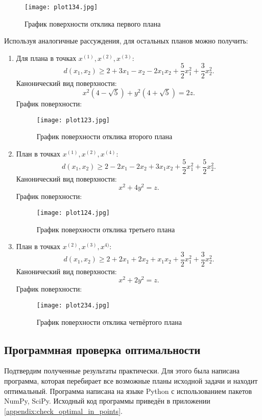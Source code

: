 \begin{figure}[h]
	\centering
	\texttt{[image: plot134.jpg]}
	\caption{График поверхности отклика первого плана}
\end{figure}

Используя аналогичные рассуждения, для остальных планов можно получить:
\begin{enumerate}
	\item Для плана в точках $x^{(1)}, x^{(2)}, x^{(3)}$:
	$$d(x_1, x_2) \ge 2 + 3x_1 - x_2 -2x_1x_2 +\frac{5}{2}x_1^2 + \frac 3 2 x_2^2.$$
	Канонический вид поверхности:
	$$x^2 (4 - \sqrt{5}) + y^2 (4 + \sqrt 5) = 2z.$$
	График поверхности:
	
	\begin{figure}[h]
		\centering
		\texttt{[image: plot123.jpg]}
		\caption{График поверхности отклика второго плана}
	\end{figure}
	
	\item План в точках $x^{(1)}, x^{(2)}, x^{(4)}$:
	$$d(x_1, x_2) \ge 2 - 2x_1 - 2x_2 +3x_1x_2 +\frac{5}{2}x_1^2 + \frac 5 2 x_2^2.$$
	Канонический вид поверхности:
	$$x^2 + 4y^2 = z.$$
	График поверхности:
	\begin{figure}[h]
		\centering
		\texttt{[image: plot124.jpg]}
		\caption{График поверхности отклика третьего плана}
	\end{figure}

	\item План в точках $x^{(2)}, x^{(3)}, x^{4)}$:
	$$d(x_1, x_2) \ge 2 + 2x_1 + 2x_2 +x_1x_2 +\frac{3}{2}x_1^2 + \frac 3 2 x_2^2.$$
	Канонический вид поверхности:
	$$x^2 + 2 y^2 = z.$$
	График поверхности:
	\begin{figure}[h]
		\centering
		\texttt{[image: plot234.jpg]}
		\caption{График поверхности отклика четвёртого плана}
	\end{figure}
\end{enumerate}

\subsection{Программная проверка оптимальности}
Подтвердим полученные результаты практически. Для этого была написана программа, которая перебирает все возможные планы исходной задачи и находит оптимальный. Программа написана на языке Python с использованием пакетов NumPy, SciPy. Исходный код программы приведён в приложении \ref{appendix:check_optimal_in_points}.

